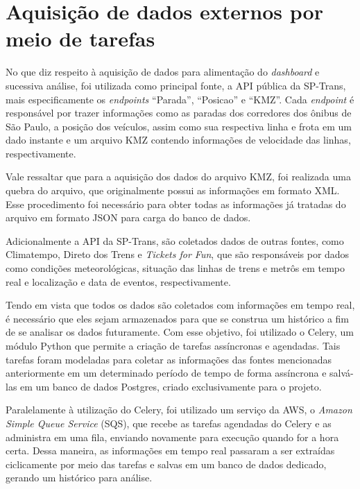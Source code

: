 \section{Aquisição de dados externos por meio de tarefas}
\indent
\par No que diz respeito à aquisição de dados para alimentação do \textit{dashboard} e sucessiva análise, foi utilizada como principal fonte, a API pública da SP-Trans, mais especificamente os \textit{endpoints} “Parada”, “Posicao” e “KMZ”. Cada \textit{endpoint} é responsável por trazer informações como as paradas dos corredores dos ônibus de São Paulo, a posição dos veículos, assim como sua respectiva linha e frota em um dado instante e um arquivo KMZ contendo informações de velocidade das linhas, respectivamente.
\indent
\par Vale ressaltar que para a aquisição dos dados do arquivo KMZ, foi realizada uma quebra do arquivo, que originalmente possui as informações em formato XML. Esse procedimento foi necessário para obter todas as informações já tratadas do arquivo em formato JSON para carga do banco de dados.
\indent
\par Adicionalmente a API da SP-Trans, são coletados dados de outras fontes, como Climatempo, Direto dos Trens e \textit{Tickets for Fun}, que são responsáveis por dados como condições meteorológicas, situação das linhas de trens e metrôs em tempo real e localização e data de eventos, respectivamente.
\indent
\par Tendo em vista que todos os dados são coletados com informações em tempo real, é necessário que eles sejam armazenados para que se construa um histórico a fim de se analisar os dados futuramente. Com esse objetivo, foi utilizado o Celery, um módulo Python que permite a criação de tarefas assíncronas e agendadas. Tais tarefas foram modeladas para coletar as informações das fontes mencionadas anteriormente em um determinado período de tempo de forma assíncrona e salvá-las em um banco de dados Postgres, criado exclusivamente para o projeto.
\indent
\par Paralelamente à utilização do Celery, foi utilizado um serviço da AWS, o \textit{Amazon Simple Queue Service} (SQS), que recebe as tarefas agendadas do Celery e as administra em uma fila, enviando novamente para execução quando for a hora certa. Dessa maneira, as informações em tempo real passaram a ser extraídas ciclicamente por meio das tarefas e salvas em um banco de dados dedicado, gerando um histórico para análise.

